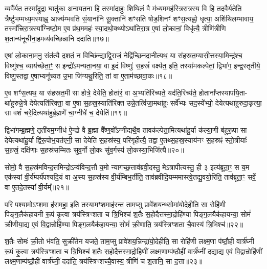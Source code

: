 व्यवै᳚र्यत॒ तस्मा᳚द्रु॒द्रा घातु॑का अनायत॒ना हि तस्मा॑दाहुः शिथि॒लं वै म॑ध्य॒ममह॑स्त्रिरा॒त्रस्य॒ वि हि तद॒वैर्य॒तेति॒ त्रैष्टु॑भम्मध्य॒मस्याह्न॒ आज्य॑म्भवति सं॒याना॑नि सू॒क्तानि॑ शꣳसति षोड॒शिनꣳ॑ शꣳस॒त्यह्नो॒ धृत्या॒ अशि॑थिलम्भावाय॒ तस्मा᳚त्त्रिरा॒त्रस्या᳚ग्निष्टो॒म ए॒व प्र॑थ॒ममहः॑ स्या॒दथो॒क्थ्यो\-ऽथा॑तिरा॒त्र ए॒षां लो॒कानां॒ विधृ॑त्यै॒ त्रीणि॑त्रीणि श॒तान्य॑नूचीना॒हमव्य॑वच्छिन्नानि ददाति॥१७॥

ए॒षां लो॒काना॒मनु॒ संत॑त्यै द॒शतं॒ न विच्छि॑न्द्याद्वि॒राजं॒ नेद्वि॑च्छि॒नदा॒नीत्यथ॒ या स॑हस्रत॒म्यासी॒त्तस्या॒मिन्द्र॑श्च॒ विष्णु॑श्च॒ व्याय॑च्छेता॒ꣳ॒ स इन्द्रो॑\-ऽमन्यता॒नया॒ वा इ॒दं विष्णुः॑ स॒हस्रं॑ वर्क्ष्यत॒ इति॒ तस्या॑मकल्पेतां॒ द्विभा॑ग॒ इन्द्र॒स्तृती॑ये॒ विष्णु॒स्तद्वा ए॒षाभ्यनू᳚च्यत उ॒भा जि॑ग्यथु॒रिति॒ तां वा ए॒ताम॑च्छावा॒कः॥१८॥

ए॒व शꣳ॑स॒त्यथ॒ या स॑हस्रत॒मी सा होत्रे॒ देयेति॒ होता॑रं॒ वा अ॒भ्यति॑रिच्यते॒ यद॑ति॒रिच्य॑ते॒ होताना᳚प्तस्यापयि॒ता- था॑हुरुन्ने॒त्रे देयेत्यति॑रिक्ता॒ वा ए॒षा स॒हस्र॒स्याति॑रिक्त उन्ने॒तर्त्विजा॒मथा॑हुः॒ सर्वे᳚भ्यः सद॒स्ये᳚भ्यो॒ देयेत्यथा॑हुरुदा॒कृत्या॒ सा वशं॑ चरे॒दित्यथा॑हुर्ब्र॒ह्मणे॑ चा॒ग्नीधे॑ च॒ देयेति॑॥१९॥

द्विभा॑गम्ब्र॒ह्मणे॒ तृती॑यम॒ग्नीध॑ ऐ॒न्द्रो वै ब्र॒ह्मा वै᳚ष्ण॒वो᳚\-ऽग्नीद्यथै॒व तावक॑ल्पेता॒मित्यथा॑हु॒र्या क॑ल्या॒णी ब॑हुरू॒पा सा देयेत्यथा॑हु॒र्या द्वि॑रू॒पोभ॒यत॑एनी॒ सा देयेति॑ स॒हस्र॑स्य॒ परि॑गृहीत्यै॒ तद्वा ए॒तथ्स॒हस्र॒स्याय॑नꣳ स॒हस्रꣴ॑ स्तो॒त्रीयाः᳚ स॒हस्रं॒ दक्षि॑णाः स॒हस्र॑सम्मितः सुव॒र्गो लो॒कः सु॑व॒र्गस्य॑ लो॒कस्या॒भिजि॑त्यै॥२०॥

{\anuvakamend[{अ॒ब्र॒वी॒च्च॒ तद॒न्तरि॑क्षन्ददात्यच्छावा॒कश्च॒ देयेति॑ स॒प्तच॑त्वारिꣳशच्च॥५॥}]}

सोमो॒ वै स॒हस्र॑मविन्द॒त्तमिन्द्रो\-ऽन्व॑विन्द॒त्तौ य॒मो न्याग॑च्छ॒त्ताव॑ब्रवी॒दस्तु॒ मे\-ऽत्रापीत्यस्तु॒ ही ३ इत्य॑ब्रूता॒ꣳ॒ स य॒म एक॑स्यां वी॒र्य॑म्पर्य॑पश्यदि॒यं वा अ॒स्य स॒हस्र॑स्य वी॒र्य॑म्बिभ॒र्तीति॒ ताव॑ब्रवीदि॒यम्ममास्त्वे॒तद्यु॒वयो॒रिति॒ ताव॑ब्रूता॒ꣳ॒ सर्वे॒ वा ए॒तदे॒तस्यां᳚ वी॒र्यम्᳚॥२१॥

परि॑ पश्या॒मो\-ऽꣳश॒मा ह॑रामहा॒ इति॒ तस्या॒मꣳश॒माह॑रन्त॒ ताम॒प्सु प्रावे॑शय॒न्थ्सोमा॑यो॒देहीति॒ सा रोहि॑णी पिङ्ग॒लैक॑हायनी रू॒पं कृ॒त्वा त्रय॑स्त्रिꣳशता च त्रि॒भिश्च॑ श॒तैः स॒होदैत्तस्मा॒द्रोहि॑ण्या पिङ्ग॒लयैक॑हायन्या॒ सोमं॑ क्रीणीया॒द्य ए॒वं वि॒द्वान्रोहि॑ण्या पिङ्ग॒लयैक॑हायन्या॒ सोमं॑ क्री॒णाति॒ त्रय॑स्त्रिꣳशता चै॒वास्य॑ त्रि॒भिश्च॑॥२२॥

श॒तैः सोमः॑ क्री॒तो भ॑वति॒ सुक्री॑तेन यजते॒ ताम॒प्सु प्रावे॑शय॒न्निन्द्रा॑यो॒देहीति॒ सा रोहि॑णी लक्ष्म॒णा प॑ष्ठौ॒ही वार्त्र॑घ्नी रू॒पं कृ॒त्वा त्रय॑स्त्रिꣳशता च त्रि॒भिश्च॑ श॒तैः स॒होदैत्तस्मा॒द्रोहि॑णीं लक्ष्म॒णाम्प॑ष्ठौ॒हीं वार्त्र॑घ्नीं दद्या॒द्य ए॒वं वि॒द्वान्रोहि॑णीं लक्ष्म॒णाम्प॑ष्ठौ॒हीं वार्त्र॑घ्नीं॒ ददा॑ति॒ त्रय॑स्त्रिꣳशच्चै॒वास्य॒ त्रीणि॑ च श॒तानि॒ सा द॒त्ता॥२३॥

